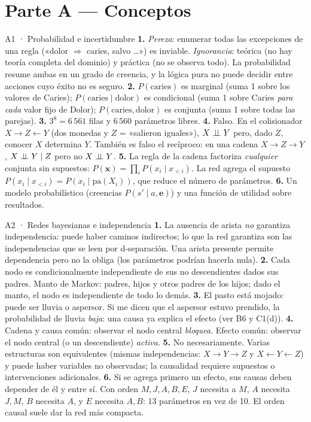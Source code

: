 \section{Parte A — Conceptos}

\begin{solucion}{A1 · Probabilidad e incertidumbre}
\textbf{1.} \emph{Pereza}: enumerar todas las excepciones de una regla («dolor $\Rightarrow$ caries, salvo …») es
inviable. \emph{Ignorancia}: teórica (no hay teoría completa del dominio) y práctica (no se observa todo). La
probabilidad resume ambas en un grado de creencia, y la lógica pura no puede decidir entre acciones cuyo éxito no es seguro.
\textbf{2.} $P(\mathrm{caries})$ es marginal (suma 1 sobre los valores de Caries); $P(\mathrm{caries}\mid\mathrm{dolor})$ es condicional
(suma 1 sobre Caries \emph{para cada} valor fijo de Dolor); $P(\mathrm{caries},\mathrm{dolor})$ es conjunta (suma 1 sobre todas las parejas).
\textbf{3.} $3^8=6\,561$ filas y $6\,560$ parámetros libres.
\textbf{4.} Falso. En el colisionador $X\to Z\leftarrow Y$ (dos monedas y $Z$ = «salieron iguales»), $X\perp\!\!\!\perp Y$ pero, dado $Z$,
conocer $X$ determina $Y$. También es falso el recíproco: en una cadena $X\to Z\to Y$, $X\perp\!\!\!\perp Y\mid Z$ pero no $X\perp\!\!\!\perp Y$.
\textbf{5.} La regla de la cadena factoriza \emph{cualquier} conjunta sin supuestos: $P(\mathbf x)=\prod_iP(x_i\mid x_{<i})$.
La red agrega el supuesto $P(x_i\mid x_{<i})=P(x_i\mid\mathrm{pa}(X_i))$, que reduce el número de parámetros.
\textbf{6.} Un modelo probabilístico (creencias $P(s'\mid a,\mathbf e)$) y una función de utilidad sobre resultados.
\end{solucion}

\begin{solucion}{A2 · Redes bayesianas e independencia}
\textbf{1.} La ausencia de arista \emph{no} garantiza independencia: puede haber caminos indirectos; lo que la red
garantiza son las independencias que se leen por d-separación. Una arista presente permite dependencia
pero no la obliga (los parámetros podrían hacerla nula).
\textbf{2.} Cada nodo es condicionalmente independiente de sus no descendientes dados sus padres. Manto de Markov:
padres, hijos y otros padres de los hijos; dado el manto, el nodo es independiente de todo lo demás.
\textbf{3.} El pasto está mojado: puede ser lluvia o aspersor. Si me dicen que el aspersor estuvo prendido, la
probabilidad de lluvia \emph{baja}: una causa ya explica el efecto (ver B6 y C1(d)).
\textbf{4.} Cadena y causa común: observar el nodo central \emph{bloquea}. Efecto común: observar el nodo central
(o un descendiente) \emph{activa}.
\textbf{5.} No necesariamente. Varias estructuras son equivalentes (mismas independencias: $X\to Y\to Z$ y
$X\leftarrow Y\leftarrow Z$) y puede haber variables no observadas; la causalidad requiere supuestos o intervenciones adicionales.
\textbf{6.} Si se agrega primero un efecto, sus causas deben depender de él y entre sí. Con orden $M,J,A,B,E$, $J$ necesita a $M$,
$A$ necesita $J,M$, $B$ necesita $A$, y $E$ necesita $A,B$: 13 parámetros en vez de 10. El orden causal suele dar la red más compacta.
\end{solucion}

